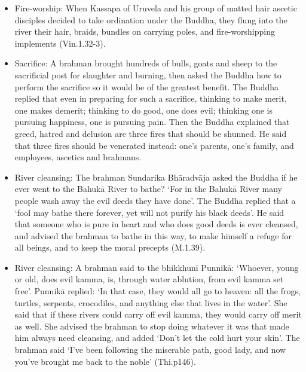 \begin{itemize}

\item Fire-worship: When Kassapa of Uruvela and his group of matted hair ascetic disciples decided to take ordination under the Buddha, they flung into the river their hair, braids, bundles on carrying poles, and fire-worshipping implements (Vin.1.32-3).

\item Sacrifice: A brahman brought hundreds of bulls, goats and sheep to the sacrificial post for slaughter and burning, then asked the Buddha how to perform the sacrifice so it would be of the greatest benefit. The Buddha replied that even in preparing for such a sacrifice, thinking to make merit, one makes demerit; thinking to do good, one does evil; thinking one is pursuing happiness, one is pursuing pain. Then the Buddha explained that greed, hatred and delusion are three fires that should be shunned. He said that three fires should be venerated instead: one's parents, one's family, and employees, ascetics and brahmans.

\item River cleansing: The brahman Sundarika Bhāradvāja asked the Buddha if he ever went to the Bahukā River to bathe? `For in the Bahukā River many people wash away the evil deeds they have done'. The Buddha replied that a `fool may bathe there forever, yet will not purify his black deeds'. He said that someone who is pure in heart and who does good deeds is ever cleansed, and advised the brahman to bathe in this way, to make himself a refuge for all beings, and to keep the moral precepts (M.1.39).

\item River cleansing: A brahman said to the bhikkhunī Punnikā: `Whoever, young or old, does evil kamma, is, through water ablution, from evil kamma set free'. Punnikā replied: `In that case, they would all go to heaven: all the frogs, turtles, serpents, crocodiles, and anything else that lives in the water'. She said that if these rivers could carry off evil kamma, they would carry off merit as well. She advised the brahman to stop doing whatever it was that made him always need cleansing, and added `Don't let the cold hurt your skin'. The brahman said `I've been following the miserable path, good lady, and now you've brought me back to the noble' (Thi.p146).


\end{itemize}
